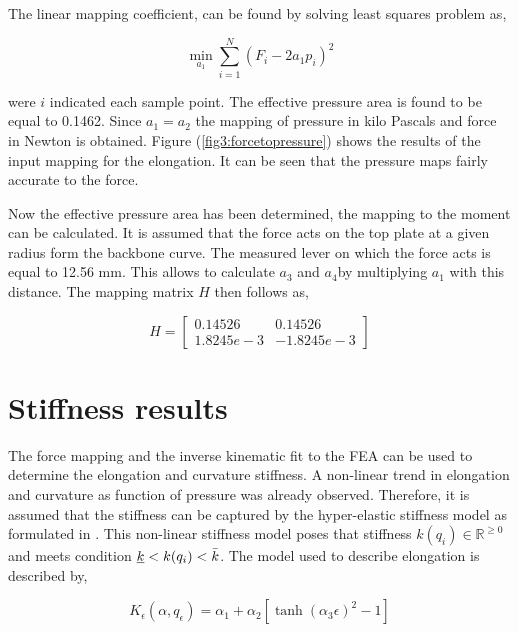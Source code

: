 The linear mapping coefficient, can be found by solving least squares problem as,



\begin{equation}
\min_{a_1} \sum_{i=1}^{N} (F_i - 2 a_1 p_i)^2
\label{eq3:forcefitting}
\end{equation}

were $i$ indicated each sample point. The effective pressure area is found to be equal to 0.1462. Since $a_1 = a_2$ the mapping of pressure in kilo Pascals and force in Newton is obtained. Figure (\ref{fig3:forcetopressure}) shows the results of the input mapping for the elongation. It can be seen that the pressure maps fairly accurate to the force.

Now the effective pressure area has been determined, the mapping to the moment can be calculated. It is assumed that the force acts on the top plate at a given radius form the backbone curve. The measured lever on which the force acts is equal to 12.56 mm. This allows to calculate $a_3$ and $a_4$by multiplying $a_1$ with this distance. The mapping matrix $H$ then follows as,

\begin{equation}
    H =  \begin{bmatrix} 0.14526 & 0.14526 \\1.8245e-3 & -1.8245e-3\end{bmatrix}  
\end{equation}




\section{Stiffness results}

The force mapping and the inverse kinematic fit to the FEA can be used to determine the elongation and curvature stiffness. A non-linear trend in elongation and curvature as function of pressure was already observed. Therefore, it is assumed that the stiffness can be captured by the hyper-elastic stiffness model as formulated in \cite{Caasenbrood2020StiffnessModel}. This non-linear stiffness model poses that stiffness $k(q_i) \in \mathbb{R}^{\geq 0}$ and meets condition $\underbar{$k$} < k(q_i) < \Bar{k}$. The model used to describe elongation is described by,

\begin{equation}
    K_\epsilon(\alpha,q_\epsilon) =  \alpha_1 + \alpha_2 [\tanh({\alpha_3 \epsilon})^2 -1]
\end{equation}


